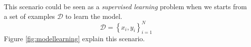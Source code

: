 \begin{enumerate}
          This scenario could be seen as a \textit{supervised learning} problem when we starts from a set of examples $\mathcal{D}$ to learn the model.
          \[
              \mathcal{D} = \left\{ x_i, y_i \right\}_{i=1}^{N}
          \]
          Figure \ref{fig:modellearning} explain this scenario.


\end{enumerate}
